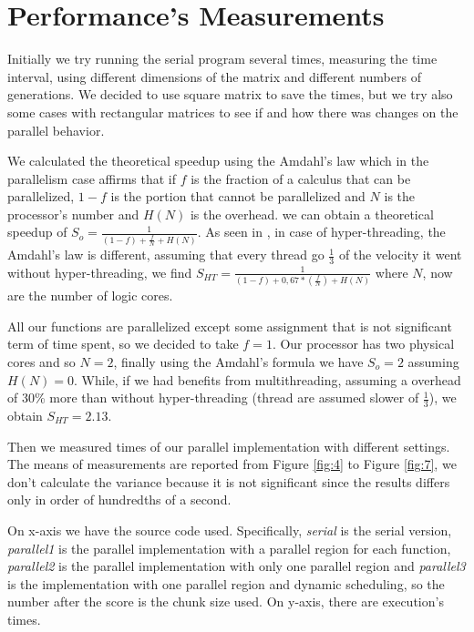 \documentclass[a4paper,11pt,twoside]{report}
\begin{document}
\chapter{Performance's Measurements}\label{am}
\noindent Initially we try running the serial program several times, measuring the time interval, using different dimensions of the matrix and different numbers of generations.
We decided to use square matrix to save the times, but we try also some cases with rectangular matrices to see if and how there was changes on the parallel behavior.

\noindent We calculated the theoretical speedup using the Amdahl's law which in the parallelism case affirms that if $f$ is the fraction of a calculus that can be parallelized, $1-f$ is the portion that cannot be parallelized and $N$ is the processor's number and $H(N)$ is the overhead. we can obtain a theoretical speedup of $S_{o} = \frac{1}{(1-f) + \frac{f}{N} + H(N)}$. As seen in \cite{multi}, in case of hyper-threading, the Amdahl's law is different, assuming that every thread go $\frac{1}{3}$ of the velocity it went without hyper-threading, we find $S_{HT} = \frac{1}{(1-f) + 0,67*(\frac{f}{N}) + H(N)}$ where $N$, now are the number of logic cores.

\noindent All our functions are parallelized except some assignment that is not significant term of time spent, so we decided to take $f = 1$. Our processor has two physical cores and so $N =2$, finally using the Amdahl's formula we have $S_o = 2$ assuming $H(N) =0$. While, if we had benefits from multithreading, assuming a overhead of 30\% more than without hyper-threading (thread are assumed slower of $\frac{1}{3}$), we obtain $S_{HT} = 2.13$.

\noindent Then we measured times of our parallel implementation with different settings. The means of measurements are reported from Figure \ref{fig:4} to Figure \ref{fig:7}, we don't calculate the variance because it is not significant since the results differs only in order of hundredths of a second.

\noindent On x-axis we have the source code used. Specifically, \emph{serial} is the serial version, \emph{parallel1} is the parallel implementation with a parallel region for each function, \emph{parallel2} is the parallel implementation with only one parallel region and \emph{parallel3} is the implementation with one parallel region and dynamic scheduling, so the number after the score is the chunk size used. On y-axis, there are execution's times.
\end{document}
